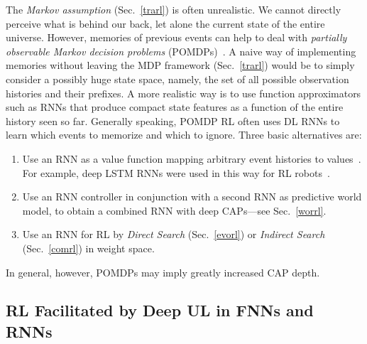 \documentclass[letterpaper]{article}
\begin{document}
\begin{sloppypar}
The {\em Markov assumption} 
(Sec.~\ref{trarl}) is often unrealistic. We cannot directly perceive 
what is behind our back, let alone the current state of the entire universe. 
However, memories of previous events
can help to deal with  
{\em partially observable Markov decision problems} (POMDPs)~\citep[e.g.,][]{Schmidhuber:90sandiego,Schmidhuber:91nips,Ring:91,Ring:93,Ring:94,Williams:92,Lin:93,Teller:94,Kaelbling:95,Littman:95,Boutilier:96,Jaakkola:95,McCallum:96,kimura1997,Wiering:96levin,Wiering:97ab,otsuka2010}.
A naive way of implementing memories without leaving the MDP framework 
(Sec.~\ref{trarl}) would be to simply consider a 
possibly huge state space, namely, 
the set of all possible observation histories and their prefixes. 
A more realistic way is to use function approximators such as RNNs that produce 
compact state features as a function of the entire history seen so far.
Generally speaking, POMDP RL often uses DL RNNs to learn 
which events to memorize and which to ignore.
Three basic alternatives are: 
\begin{enumerate}
\item
Use an RNN as a value function mapping arbitrary event histories to values~\citep[e.g.,][]{Schmidhuber:90cmss,Schmidhuber:91nips,Lin:93,Bakker:01nips}. 
For example, deep LSTM RNNs were used in this way for RL robots~\citep{Bakker:03robot}.
\item
Use an RNN controller in conjunction with a second RNN as predictive world model,
to obtain a combined RNN with deep CAPs---see Sec.~\ref{worrl}.
\item
Use an RNN for RL by {\em Direct Search} (Sec.~\ref{evorl}) or {\em Indirect Search} (Sec.~\ref{comrl}) in weight space.
\end{enumerate}
In general, however, POMDPs may imply greatly increased CAP depth.



\subsection{RL Facilitated by Deep UL in FNNs and RNNs}
\label{unsrl}


\end{sloppypar}
\end{document}
